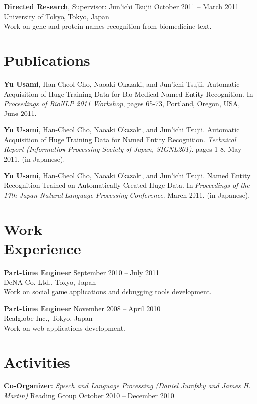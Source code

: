\documentclass[margin]{res}
\begin{document}
\begin{resume}
\textbf{Directed Research}, Supervisor: Jun'ichi Tsujii \hfill October 2011 -- March 2011\\
University of Tokyo, Tokyo, Japan\\
Work on gene and protein names recognition from biomedicine text.\\

\section{Publications}
\textbf{Yu Usami}, Han-Cheol Cho, Naoaki Okazaki, and Jun'ichi Tsujii. Automatic Acquisition of Huge Training Data for Bio-Medical Named Entity Recognition. 
In \textit{Proceedings of BioNLP 2011 Workshop}, pages 65-73, Portland, Oregon, USA, June 2011.

\textbf{Yu Usami}, Han-Cheol Cho, Naoaki Okazaki, and Jun'ichi Tsujii. Automatic Acquisition of Huge Training Data for Named Entity Recognition.
\textit{Technical Report (Information Processing Society of Japan, SIGNL201)}. pages 1-8, May 2011. (in Japanese).

\textbf{Yu Usami}, Han-Cheol Cho, Naoaki Okazaki, and Jun'ichi Tsujii. Named Entity Recognition Trained on Automatically Created Huge Data.
In \textit{Proceedings of the 17th Japan Natural Language Processing Conference}. March 2011. (in Japanese).\\

\section{Work \\ Experience}
\textbf{Part-time Engineer} \hfill September 2010 -- July 2011\\
DeNA Co. Ltd., Tokyo, Japan\\
Work on social game applications and debugging tools development.

\textbf{Part-time Engineer} \hfill November 2008 -- April 2010\\
Realglobe Inc., Tokyo, Japan\\
Work on web applications development.\\

\section{Activities}
\textbf{Co-Organizer:} {\sl Speech and Language Processing (Daniel Jurafsky and James H. Martin)} Reading Group \hfill October 2010 -- December 2010


\end{resume}
\end{document}
